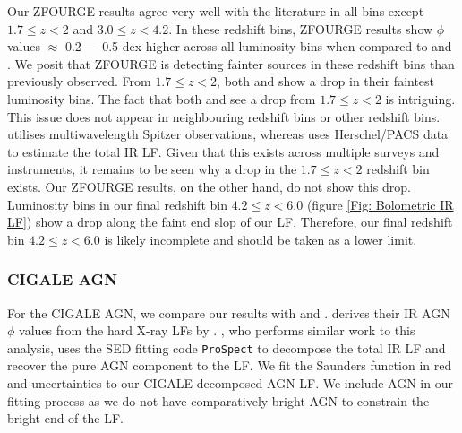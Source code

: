 Our ZFOURGE results agree very well with the literature in all bins except $1.7 \leq z < 2$ and $3.0 \leq z < 4.2$. In these redshift bins, ZFOURGE results show $\phi$ values $\approx$ 0.2 --- 0.5 dex higher across all luminosity bins when compared to \cite{rodighiero_mid-_2010} and \cite{gruppioni_herschel_2013}. We posit that ZFOURGE is detecting fainter sources in these redshift bins than previously observed. From $1.7 \leq z < 2$, both \cite{rodighiero_mid-_2010} and \cite{gruppioni_herschel_2013} show a drop in their faintest luminosity bins. The fact that both \cite{gruppioni_herschel_2013} and \cite{rodighiero_mid-_2010} see a drop from $1.7 \leq z < 2$ is intriguing. This issue does not appear in neighbouring redshift bins or other redshift bins. \cite{rodighiero_mid-_2010} utilises multiwavelength Spitzer observations, whereas \cite{gruppioni_herschel_2013} uses Herschel/PACS data to estimate the total IR LF. Given that this exists across multiple surveys and instruments, it remains to be seen why a drop in the $1.7 \leq z < 2$ redshift bin exists. Our ZFOURGE results, on the other hand, do not show this drop. Luminosity bins in our final redshift bin $4.2 \leq z < 6.0$ (figure \ref{Fig: Bolometric IR LF}) show a drop along the faint end slop of our LF. Therefore, our final redshift bin $4.2 \leq z < 6.0$ is likely incomplete and should be taken as a lower limit.

\subsubsection{CIGALE AGN}
For the CIGALE AGN, we compare our results with \cite{delvecchio_tracing_2014, symeonidis_agn_2021} and \cite{thorne_deep_2022}. \cite{symeonidis_agn_2021} derives their IR AGN $\phi$ values from the hard X-ray LFs by \cite{aird_evolution_2015}. \cite{thorne_deep_2022}, who performs similar work to this analysis, uses the SED fitting code \texttt{ProSpect} \citep{leja_deriving_2017, robotham_prospect_2020} to decompose the total IR LF and recover the pure AGN component to the LF. We fit the Saunders function in red and uncertainties to our CIGALE decomposed AGN LF. We include \cite{thorne_deep_2022} AGN in our fitting process as we do not have comparatively bright AGN to constrain the bright end of the LF. 


